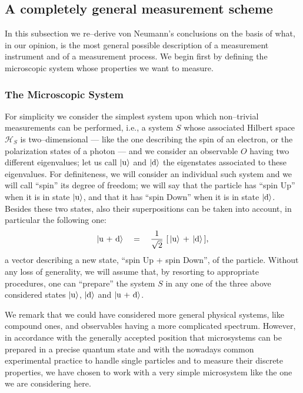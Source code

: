 \documentclass[10pt,a4paper]{article}
\begin{document}
\subsection{A completely general measurement scheme} \label{sec22}

In this subsection we re--derive von Neumann's conclusions on the
basis of what, in our opinion, is the most general possible
description of a measurement instrument and of a measurement
process. We begin first by defining the microscopic system whose
properties we want to measure.

\subsubsection{The Microscopic System} \label{sec221}

For simplicity we consider the simplest system upon which
non--trivial measurements can be performed, i.e., a system $S$
whose associated Hilbert space ${\mathcal H}_{S}$ is
two--dimensional  --- like the one describing the spin of an
electron, or the polarization states of a photon --- and we
consider  an observable $O$  having two different eigenvalues; let
us call $|\makebox{u}\rangle$ and $|\makebox{d}\rangle$ the
eigenstates associated to these eigenvalues. For definiteness, we
will consider an individual such system and we will call ``spin''
its degree of freedom;  we will say that the particle has ``spin
Up'' when it is in state $|\makebox{u}\rangle$, and that it has
``spin Down'' when it is in state $|\makebox{d}\rangle$. Besides
these two states, also their superpositions can be taken into
account, in particular the following one:
\[
| \makebox{u + d}\rangle \quad =\quad \frac{1}{\sqrt{2}}\,\,[\,
|\makebox{u}\rangle\, +\, |\makebox{d}\rangle\,],
\]
a vector describing a new state, ``spin Up + spin Down'', of the
particle. Without any loss of generality, we will assume that, by
resorting to appropriate procedures, one can ``prepare'' the
system $S$ in any one of the three above considered states
$|\makebox{u}\rangle$, $|\makebox{d}\rangle$ and $|\makebox{u +
d}\rangle$.

We remark that we could have considered more general physical
systems, like compound ones, and observables having a more
complicated spectrum. However, in accordance with the generally
accepted position  that microsystems can be prepared in  a precise
quantum state and with the nowadays common experimental practice
to  handle single particles and to measure their discrete
properties, we have chosen to work with a very simple microsystem
like the one we are considering here.
\end{document}
